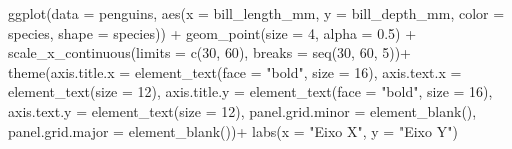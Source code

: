 \documentclass[
]{book}
\newenvironment{Shaded}{\begin{snugshade}}{\end{snugshade}}
\newcommand{\AttributeTok}[1]{\textcolor[rgb]{0.61,0.61,0.61}{#1}}
\newcommand{\DecValTok}[1]{\textcolor[rgb]{0.06,0.06,0.06}{#1}}
\newcommand{\FloatTok}[1]{\textcolor[rgb]{0.06,0.06,0.06}{#1}}
\newcommand{\FunctionTok}[1]{\textcolor[rgb]{0,0,0}{#1}}
\newcommand{\NormalTok}[1]{#1}
\newcommand{\SpecialCharTok}[1]{\textcolor[rgb]{0,0,0}{#1}}
\newcommand{\StringTok}[1]{\textcolor[rgb]{0.5,0.5,0.5}{#1}}
\begin{document}
\begin{Shaded}
\begin{Highlighting}[]
\FunctionTok{ggplot}\NormalTok{(}\AttributeTok{data =}\NormalTok{ penguins, }
       \FunctionTok{aes}\NormalTok{(}\AttributeTok{x =}\NormalTok{ bill\_length\_mm, }
           \AttributeTok{y =}\NormalTok{ bill\_depth\_mm,}
           \AttributeTok{color =}\NormalTok{ species,}
           \AttributeTok{shape =}\NormalTok{ species)) }\SpecialCharTok{+}
  \FunctionTok{geom\_point}\NormalTok{(}\AttributeTok{size =} \DecValTok{4}\NormalTok{, }\AttributeTok{alpha =} \FloatTok{0.5}\NormalTok{) }\SpecialCharTok{+}
  \FunctionTok{scale\_x\_continuous}\NormalTok{(}\AttributeTok{limits =} \FunctionTok{c}\NormalTok{(}\DecValTok{30}\NormalTok{, }\DecValTok{60}\NormalTok{), }\AttributeTok{breaks =} \FunctionTok{seq}\NormalTok{(}\DecValTok{30}\NormalTok{, }\DecValTok{60}\NormalTok{, }\DecValTok{5}\NormalTok{))}\SpecialCharTok{+}
  \FunctionTok{theme}\NormalTok{(}\AttributeTok{axis.title.x =} \FunctionTok{element\_text}\NormalTok{(}\AttributeTok{face =} \StringTok{"bold"}\NormalTok{, }\AttributeTok{size =} \DecValTok{16}\NormalTok{),}
        \AttributeTok{axis.text.x =} \FunctionTok{element\_text}\NormalTok{(}\AttributeTok{size =} \DecValTok{12}\NormalTok{),}
        \AttributeTok{axis.title.y =} \FunctionTok{element\_text}\NormalTok{(}\AttributeTok{face =} \StringTok{"bold"}\NormalTok{, }\AttributeTok{size =} \DecValTok{16}\NormalTok{),}
        \AttributeTok{axis.text.y =} \FunctionTok{element\_text}\NormalTok{(}\AttributeTok{size =} \DecValTok{12}\NormalTok{),}
        \AttributeTok{panel.grid.minor =} \FunctionTok{element\_blank}\NormalTok{(),}
        \AttributeTok{panel.grid.major =} \FunctionTok{element\_blank}\NormalTok{())}\SpecialCharTok{+}
  \FunctionTok{labs}\NormalTok{(}\AttributeTok{x =} \StringTok{"Eixo X"}\NormalTok{, }\AttributeTok{y =} \StringTok{"Eixo Y"}\NormalTok{)}


\end{Highlighting}
\end{Shaded}
\end{document}
